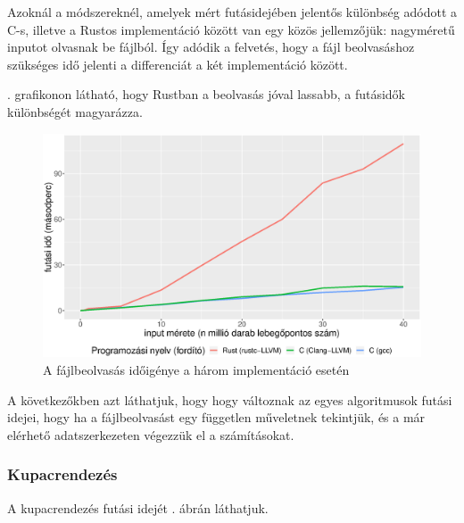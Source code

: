 

Azoknál a módszereknél, amelyek mért futásidejében jelentős különbség adódott a C-s, illetve a Rustos implementáció között van egy közös jellemzőjük: nagyméretű inputot olvasnak be fájlból. Így adódik a felvetés, hogy a fájl beolvasáshoz szükséges idő jelenti a differenciát a két implementáció között.

. grafikonon látható, hogy Rustban a beolvasás jóval lassabb, a futásidők különbségét magyarázza.

\begin{figure}[h!]
\centering
\includegraphics[width=15.5cm]{kepek/file_read.eps}
\caption{A fájlbeolvasás időigénye a három implementáció esetén}
\label{fig:file}
\end{figure}


A következőkben azt láthatjuk, hogy hogy változnak az egyes algoritmusok futási idejei, hogy ha a fájlbeolvasást egy független műveletnek tekintjük, és a már elérhető adatszerkezeten végezzük el a számításokat.

\subsubsection{Kupacrendezés}

A kupacrendezés futási idejét . ábrán láthatjuk.

